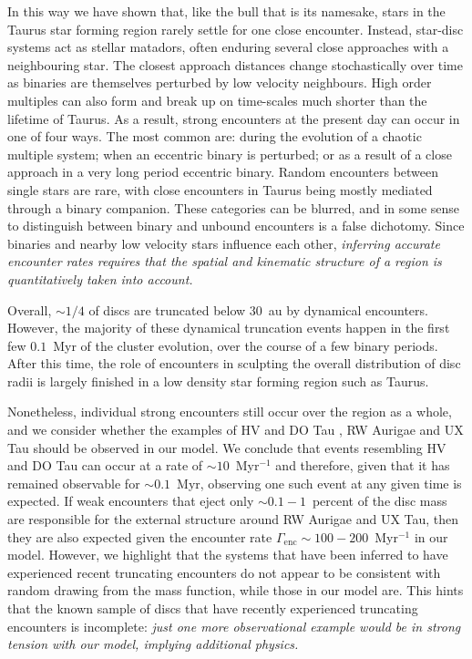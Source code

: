 \documentclass{aa}
\begin{document}
In this way we have shown that, like the bull that is its namesake, stars in the Taurus star forming region rarely settle for one close encounter. Instead, star-disc systems act as stellar matadors, often enduring several close approaches with a neighbouring star. The closest approach distances change stochastically over time as binaries are themselves perturbed by low velocity neighbours. High order multiples can also form and break up on time-scales much shorter than the lifetime of Taurus. As a result, strong encounters at the present day can occur in one of four ways. The most common are: during the evolution of a chaotic multiple system; when an eccentric binary is perturbed; or as a result of a close approach in a very long period eccentric binary. Random encounters between single stars are rare, with close encounters in Taurus being mostly mediated through a binary companion. These categories can be blurred, and in some sense to distinguish between binary and unbound encounters is a false dichotomy. Since binaries and nearby low velocity stars influence each other, {\textit{inferring accurate encounter rates requires that the spatial and kinematic structure of a region is quantitatively taken into account. }}

Overall, $\sim 1/4$ of discs are truncated below $30$~au by dynamical encounters. However, the majority of these dynamical truncation  events happen in the first few $0.1$~Myr of the cluster evolution, over the course of a few binary periods. After this time, the role of encounters in sculpting the overall distribution of disc radii is largely finished in a low density star forming region such as Taurus.

Nonetheless, individual strong encounters still occur over the region as a whole, and we consider whether the examples of HV and DO Tau \citep{Howard13, Winter18c}, RW Aurigae \citep{Dai15, Rodriguez18} and UX Tau \citep{Zapata20, Menard20} should be observed in our model. We conclude that events resembling HV and DO Tau can occur at a rate of $\sim 10$~Myr$^{-1}$ and therefore, given that it has remained observable for $\sim 0.1$~Myr, observing one such event at any given time is expected. If weak encounters that eject only $\sim 0.1- 1$~percent of the disc mass are responsible for the external structure around RW Aurigae and UX Tau, then they are also expected given the encounter rate $\Gamma_\mathrm{enc} \sim 100{-}200$~Myr$^{-1}$ in our model. However, we highlight that the systems that have been inferred to have experienced recent truncating encounters do not appear to be consistent with random drawing from the mass function, while those in our model are. This hints that the known sample of discs that have recently experienced truncating encounters is incomplete: {\textit{just one more observational example would be in strong tension with our model, implying additional physics.}} 
\end{document}
